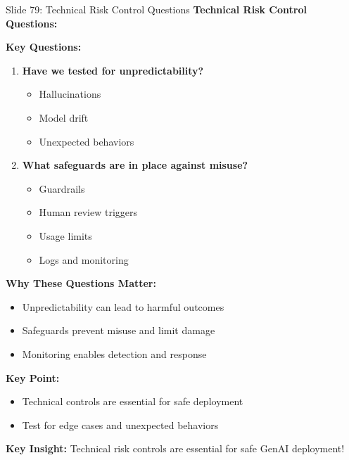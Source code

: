 \documentclass[8pt]{beamer}
\begin{document}
	\begin{frame}{Slide 79: Technical Risk Control Questions}
		\fontsize{6.5}{7.5}\selectfont
		\textbf{Technical Risk Control Questions:}
		
		\vspace{0.1cm}
		\textbf{Key Questions:}
		\begin{enumerate}
			\item \textbf{Have we tested for unpredictability?}
			\begin{itemize}
				\item Hallucinations
				\item Model drift
				\item Unexpected behaviors
			\end{itemize}
			\item \textbf{What safeguards are in place against misuse?}
			\begin{itemize}
				\item Guardrails
				\item Human review triggers
				\item Usage limits
				\item Logs and monitoring
			\end{itemize}
		\end{enumerate}
		
		\vspace{0.1cm}
		\textbf{Why These Questions Matter:}
		\begin{itemize}
			\item Unpredictability can lead to harmful outcomes
			\item Safeguards prevent misuse and limit damage
			\item Monitoring enables detection and response
		\end{itemize}
		
		\vspace{0.1cm}
		\textbf{Key Point:}
		\begin{itemize}
			\item Technical controls are essential for safe deployment
			\item Test for edge cases and unexpected behaviors
		\end{itemize}
		
		\textcolor{myblue}{\textbf{Key Insight:}} Technical risk controls are \textcolor{myblue}{essential for safe GenAI deployment}!
	\end{frame}
	
\end{document}

